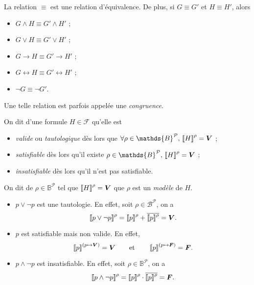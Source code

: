 \begin{rmk}
	La relation $\equiv$\/ est une relation d'équivalence. De plus, si $G \equiv G'$\/ et $H \equiv H'$, alors
	\vspace{-3mm}
	\begin{multicols}{3}
		\begin{itemize}
			\item $G \land H \equiv G' \land H'$\/ ;
			\item $G \lor H \equiv G' \lor H'$\/ ;
			\item $G \to H \equiv G' \to H'$\/ ;
			\item $G \leftrightarrow H \equiv G' \leftrightarrow H'$\/ ;
			\item $\lnot G \equiv \lnot G'$.
		\end{itemize}
	\end{multicols}
	\vspace{-4mm}
	\noindent Une telle relation est parfois appelée une {\it congruence}.
\end{rmk}

\begin{defn}
	On dit d'une formule $H \in \mathcal{F}$\/ qu'elle est 
	\begin{itemize}
		\item {\it valide}\/ ou {\it tautologique}\/ dès lors que $\forall \rho \in \mathds{B}^\mathcal{P},\,\left\llbracket H \right\rrbracket^\rho = {\bfm V}\/$ ;
		\item {\it satisfiable}\/ dès lors qu'il existe $\rho \in \mathds{B}^\mathcal{P},\,\left\llbracket H \right\rrbracket^\rho = {\bfm V}\/$\/ ;
		\item {\it insatisfiable}\/ dès lors qu'il n'est pas satisfiable.
	\end{itemize}

	On dit de $\rho \in \mathds{B}^\mathcal{P}$\/ tel que $\left\llbracket H \right\rrbracket^\rho = {\bm{V}}\/$\/ que $\rho$\/ est un {\it modèle}\/ de $H$.
\end{defn}

\begin{exm}
	\begin{itemize}
		\item $p \lor\lnot p$\/ est une tautologie. En effet, soit $\rho \in \mathcal{B}^\mathcal{P}$, on a \[
				\left\llbracket p\lor\lnot p \right\rrbracket^\rho = \left\llbracket p \right\rrbracket^\rho + \overline{\left\llbracket p \right\rrbracket^\rho} = {\bm{V}}
			.\]
		\item $p$\/ est satisfiable mais non valide. En effet, \[
				\left\llbracket p \right\rrbracket^{(p\mapsto {\bm{V}})} = {\bm{V}}\/\qquad\text{et}\qquad\left\llbracket p \right\rrbracket^{(p\mapsto {\bm{F}})} = {\bm{F}}
			.\]
		\item $p \land \lnot p$\/ est insatisfiable. En effet, soit $\rho \in \mathds{B}^\mathcal{P}$, on a \[
					\left\llbracket p \land \lnot p \right\rrbracket^\rho = \left\llbracket p \right\rrbracket^\rho \cdot \overline{\left\llbracket p \right\rrbracket^\rho} = {\bm{F}}.
			\]
	\end{itemize}
\end{exm}

